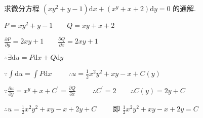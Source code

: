 \begin{problem}[points = 6]
求微分方程 $(xy^2 + y - 1)\mathrm{d}x + (x^y + x + 2)\mathrm{d}y = 0$ 的通解.
\end{problem}
\begin{solution}
    $P = xy^2 + y - 1 \qquad Q = xy + x + 2$

    $\frac{\partial P}{\partial y} = 2xy + 1 \qquad \frac{\partial Q}{\partial x} = 2xy + 1$

    $\therefore \exists \mathrm{d}u = P\mathrm{d}x + Q\mathrm{d}y$

    $\because \int \mathrm{d}u = \int P\mathrm{d}x \qquad$
    $\therefore u = \frac{1}{2}x^2y^2 + xy - x + C(y)$

    $\because \frac{\partial u}{\partial y} = x^y + x + C^{\prime} = \frac{\partial Q}{\partial x} \qquad$
    $\therefore C^{\prime} = 2 \qquad \therefore C(y) = 2y + C$

    $\therefore u = \frac{1}{2}x^2y^2 + xy - x + 2y + C \qquad$
    即 $\frac{1}{2}x^2y^2 + xy - x + 2y = C$
\end{solution}
